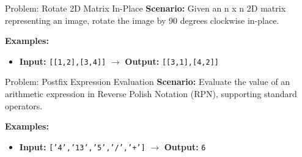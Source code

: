 \begin{frame}[fragile]{Problem: Rotate 2D Matrix In-Place}
  \textbf{Scenario:}
  Given an n x n 2D matrix representing an image, rotate the image by 90 degrees clockwise in-place.
  
  \vspace{0.3cm}
  \textbf{Examples:}
  \begin{itemize}
    \item \textbf{Input:} \texttt{[[1,2],[3,4]]} $\rightarrow$ \textbf{Output:} \texttt{[[3,1],[4,2]]}
  \end{itemize}
\end{frame}

\begin{frame}[fragile]{Problem: Postfix Expression Evaluation}
  \textbf{Scenario:}
  Evaluate the value of an arithmetic expression in Reverse Polish Notation (RPN), supporting standard operators.
  
  \vspace{0.3cm}
  \textbf{Examples:}
  \begin{itemize}
    \item \textbf{Input:} \texttt{['4','13','5','/','+']} $\rightarrow$ \textbf{Output:} \texttt{6}
  \end{itemize}
\end{frame}
